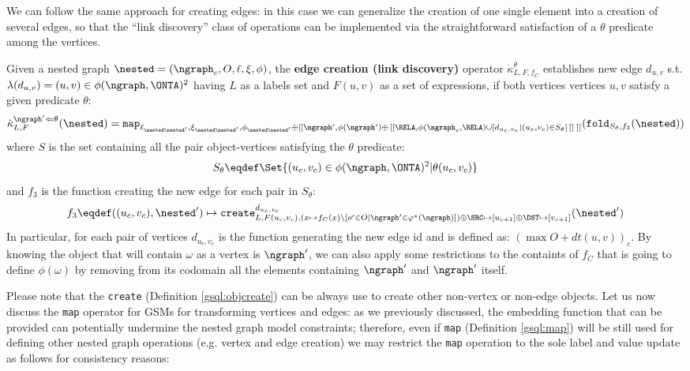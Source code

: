 We can follow the same approach for creating edges: in this case we can generalize the creation of one single element into a creation of several edges, so that the ``link discovery'' class of operations can be implemented \cite{markus} via the straightforward satisfaction of a $\theta$ predicate among the vertices.

\begin{definition}
	Given a nested graph $\nested=(\ngraph_c,O,\ell,\xi,\phi)$, the \textbf{edge creation (link discovery)} operator $\dot\kappa^\theta_{L,F,f_C}$ establishes new edge  $d_{u,v}$ s.t. $\lambda(d_{u,v})=(u,v)\in\phi(\ngraph,\ONTA)^2$ having $L$ as a labels set and $F(u,v)$ as a set of expressions, if both vertices vertices $u,v$ satisfy a given predicate $\theta$:
	\[\dot\kappa^{\ngraph'\Leftarrow\theta}_{L,F}(\nested)=\texttt{map}_{\ell_{\nested\nested'},\xi_{\nested\nested'},\phi_{\nested\nested'}\oplus [[\ngraph', \phi(\ngraph')\oplus\,[[\RELA, \phi(\ngraph_c,\RELA)\cup[d_{u_c,v_c}|(u_c,v_c)\in S_\theta]\,]] \;]]}(\texttt{fold}_{S_\theta,f_3}(\nested))\]
	where $S$ is the set containing all the pair object-vertices satisfying the $\theta$ predicate:
	\[S_\theta\eqdef\Set{(u_c,v_c)\in\phi(\ngraph,\ONTA)^2|\theta(u_c,v_c)}\]
	and $f_3$ is the function creating the new edge for each pair in $S_\theta$:
	\[f_3\eqdef((u_c,v_c),\nested')\mapsto\texttt{create}^{d_{u_c,v_c}}_{L,F(u_c,v_c), (x\mapsto f_C(x)\backslash[o'\in O|\ngraph'\in\varphi^*(\ngraph)])\oplus\SRC\mapsto [u_{c+1}]\oplus \DST\mapsto [v_{c+1}]}(\nested')\]
	In particular, for each pair of vertices $d_{u_c,v_c}$ is the function generating the new edge id and is defined as: $(\max O+dt(u,v))_{c}$.  By knowing the object that will contain $\omega$ as a vertex is $\ngraph'$, we can also apply some restrictions to the containts of $f_C$ that is going to define $\phi(\omega)$ by removing from its codomain all the elements containing $\ngraph'$ and $\ngraph'$ itself.
\end{definition}

Please note that the \texttt{create} (Definition \vref{gsql:objcreate}) can be always use to create other non-vertex or non-edge objects. Let us now discuss the \texttt{map} operator for GSMs for transforming vertices and edges: as we previously discussed, the embedding function that can be provided can potentially undermine the nested graph model constraints; therefore, even if \texttt{map} (Definition \vref{gsql:map}) will be still used for defining other nested graph operations (e.g. vertex and edge creation) we may restrict the \texttt{map} operation to the sole label and value update as follows for consistency reasons:

